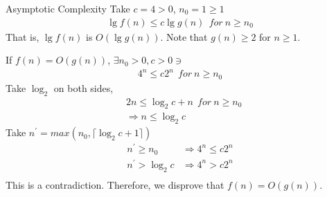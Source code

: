 \begin{homeworkProblem}{Asymptotic Complexity}
    Take $c = 4 > 0$, $n_0 = 1 \geq 1$
    \[
        \begin{split}
            \lg f(n) \leq c \lg g(n)~~for~n \geq n_0
        \end{split}
    \]
    That is, $\lg f(n)$ is $O(\lg g(n))$. Note that $g(n) \geq 2$ for $n \geq 1$.

    If $f(n) = O(g(n))$, $\exists n_0 > 0, c > 0 \ni$
    \[
        \begin{split}
            4^n \leq c 2^n~~for~n \geq n_0
        \end{split}
    \]
    Take $\log_2$ on both sides,
    \[
        \begin{split}
            &2n \leq \log_2 c + n~~for~n \geq n_0 \\
            &\Rightarrow n \leq \log_2 c 
        \end{split}
    \]
    Take $n^{\prime} = max(n_0, \lceil \log_2 c + 1 \rceil)$
    \[
        \begin{split}
            n^{\prime} \geq n_0 &\Rightarrow 4^n \leq c 2^n \\
            n^{\prime} > \log_2 c &\Rightarrow 4^n > c 2^n \\
        \end{split}
    \]
    This is a contradiction. Therefore, we disprove that $f(n) = O(g(n))$.

\end{homeworkProblem}

\pagebreak

